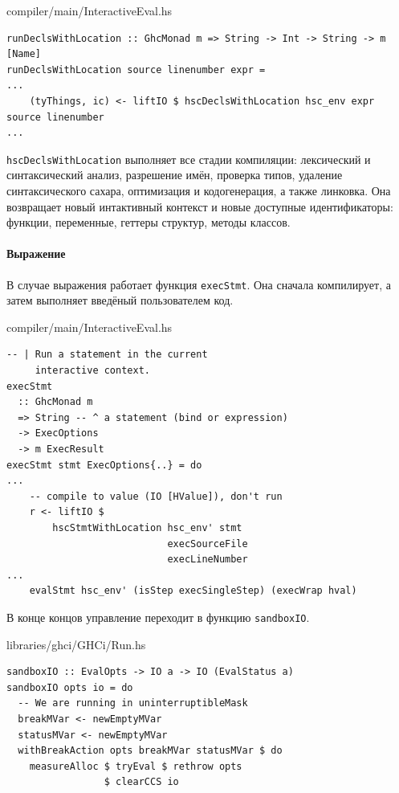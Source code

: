 \documentclass[fontsize=14pt, paper=a4, pagesize, DIV=calc]{scrartcl}
\def\code#1{\texttt{#1}}
\begin{document}
\begin{ListingEnv}
\caption{compiler/main/InteractiveEval.hs}
\begin{lstlisting}[firstnumber=199]
runDeclsWithLocation :: GhcMonad m => String -> Int -> String -> m [Name]
runDeclsWithLocation source linenumber expr =
...
    (tyThings, ic) <- liftIO $ hscDeclsWithLocation hsc_env expr source linenumber
...
\end{lstlisting}
\end{ListingEnv}

\code{hscDeclsWithLocation} выполняет все стадии компиляции: лексический и
синтаксический анализ, разрешение имён, проверка типов, удаление
синтаксического сахара, оптимизация и кодогенерация, а также линковка.  Она
возвращает новый интактивный контекст и новые доступные идентификаторы:
функции, переменные, геттеры структур, методы классов.

\paragraph{Выражение}

В случае выражения работает функция \code{execStmt}. Она сначала компилирует, а
затем выполняет введёный пользователем код.

\begin{ListingEnv}
\caption{compiler/main/InteractiveEval.hs}
\begin{lstlisting}
-- | Run a statement in the current 
     interactive context.
execStmt
  :: GhcMonad m
  => String -- ^ a statement (bind or expression)
  -> ExecOptions
  -> m ExecResult
execStmt stmt ExecOptions{..} = do
...
    -- compile to value (IO [HValue]), don't run
    r <- liftIO $ 
        hscStmtWithLocation hsc_env' stmt 
                            execSourceFile 
                            execLineNumber
...
    evalStmt hsc_env' (isStep execSingleStep) (execWrap hval)
\end{lstlisting}
\end{ListingEnv}

В конце концов управление переходит в функцию \code{sandboxIO}.

\begin{ListingEnv}
\caption{libraries/ghci/GHCi/Run.hs}
\begin{lstlisting}[numbers=none]
sandboxIO :: EvalOpts -> IO a -> IO (EvalStatus a)
sandboxIO opts io = do
  -- We are running in uninterruptibleMask
  breakMVar <- newEmptyMVar
  statusMVar <- newEmptyMVar
  withBreakAction opts breakMVar statusMVar $ do
    measureAlloc $ tryEval $ rethrow opts 
                 $ clearCCS io
\end{lstlisting}
\end{ListingEnv}
\end{document}
